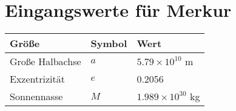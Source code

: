 \section{Eingangswerte für Merkur}
\begin{table}[h]
\centering
\begin{tabular}{|l|l|l|}
\hline
\textbf{Größe} & \textbf{Symbol} & \textbf{Wert} \\ \hline
Große Halbachse & $a$ & $5.79 \times 10^{10}$ m \\ \hline
Exzentrizität & $e$ & 0.2056 \\ \hline
Sonnennasse & $M$ & $1.989 \times 10^{30}$ kg \\ \hline
\end{tabular}
\end{table}